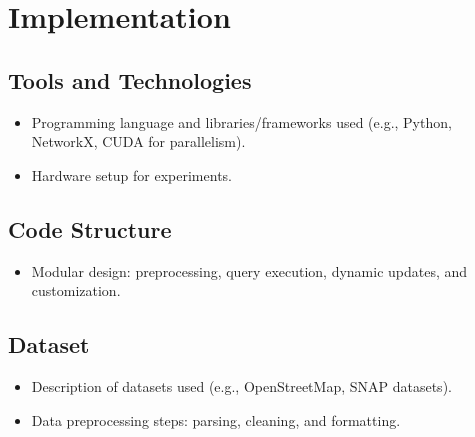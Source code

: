 \chapter{Implementation}

\section{Tools and Technologies}
	\begin{itemize}
		\item Programming language and libraries/frameworks used (e.g., Python, NetworkX, CUDA for parallelism).
		\item Hardware setup for experiments.
	\end{itemize}
\section{Code Structure}
	\begin{itemize}
		\item Modular design: preprocessing, query execution, dynamic updates, and customization.
	\end{itemize}
\section{Dataset}
	\begin{itemize}
		\item Description of datasets used (e.g., OpenStreetMap, SNAP datasets).
		\item Data preprocessing steps: parsing, cleaning, and formatting.
	\end{itemize}